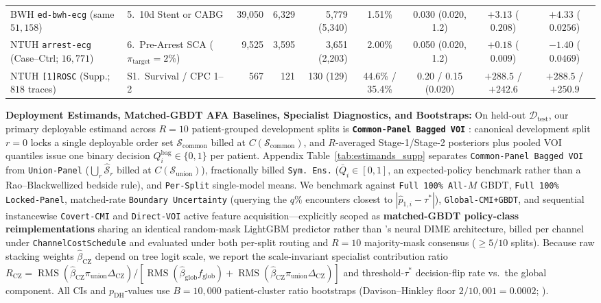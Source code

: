 \documentclass[11pt]{article}
\theoremstyle{remark}
\begin{document}
\begin{table}[t]
{\begin{tabular}{llrrrcccc}
BWH \texttt{ed-bwh-ecg} (same $51{,}158$) & 5.\ 10d Stent or CABG & 39,050 & 6,329 & 5,779 (5,340) & 1.51\% & 0.030 (0.020, 1.2) & $+3.13$ ($0.208$) & $+4.33$ ($0.0256$) \\
NTUH \texttt{arrest-ecg} (Case--Ctrl; $16{,}771$) & 6.\ Pre-Arrest SCA ($\pi_{\text{target}}=2\%$) & 9,525 & 3,595 & 3,651 (2,203) & 2.00\% & 0.050 (0.020, 1.2) & $+0.18$ ($0.009$) & $-1.40$ ($0.0469$) \\
\midrule
NTUH \texttt{[1]ROSC} (Supp.; $818$ traces) & S1.\ Survival / CPC 1--2 & 567 & 121 & 130 (129) & 44.6\% / 35.4\% & 0.20 / 0.15 (0.020) & $+288.5$ / $+242.6$ & $+288.5$ / $+250.9$ \\
\bottomrule
\end{tabular}%
}
\end{table}

\textbf{Deployment Estimands, Matched-GBDT AFA Baselines, Specialist Diagnostics, and Bootstraps:} On held-out $\mathcal{D}_{\text{test}}$, our primary deployable estimand across $R=10$ patient-grouped development splits is \textbf{\texttt{Common-Panel Bagged VOI}} \citep{satz2026collision}: canonical development split $r=0$ locks a single deployable order set $\mathcal{S}_{\text{common}}$ billed at $C(\mathcal{S}_{\text{common}})$, and $R$-averaged Stage-1/Stage-2 posteriors plus pooled VOI quantiles issue one binary decision $Q_i^{\text{bag}} \in \{0,1\}$ per patient. Appendix Table~\ref{tab:estimands_supp} separates \texttt{Common-Panel Bagged VOI} from \texttt{Union-Panel} ($\bigcup_r \hat{\mathcal{S}}_r$ billed at $C(\mathcal{S}_{\text{union}})$), fractionally billed \texttt{Sym.\ Ens.} ($\bar{Q}_i \in [0,1]$, an expected-policy benchmark rather than a Rao--Blackwellized bedside rule), and \texttt{Per-Split} single-model means. We benchmark against \texttt{Full 100\% All-$M$} GBDT, \texttt{Full 100\% Locked-Panel}, matched-rate \texttt{Boundary Uncertainty} (querying the $q\%$ encounters closest to $|\hat{p}_{1,i}-\tau^*|$), \texttt{Global-CMI+GBDT}, and sequential instancewise \texttt{Covert-CMI} and \texttt{Direct-VOI} active feature acquisition---explicitly scoped as \textbf{matched-GBDT policy-class reimplementations} sharing an identical random-mask LightGBM predictor rather than \citet{covert2023learning}'s neural DIME architecture, billed per channel under \texttt{ChannelCostSchedule} and evaluated under both per-split routing and $R=10$ majority-mask consensus ($\ge 5/10$ splits). Because raw stacking weights $\hat{\beta}_{\text{CZ}}$ depend on tree logit scale, we report the scale-invariant specialist contribution ratio $R_{\text{CZ}} = \operatorname{RMS}(\hat{\beta}_{\text{CZ}}\pi_{\text{union}}\Delta_{\text{CZ}})/[\operatorname{RMS}(\hat{\beta}_{\text{glob}}f_{\text{glob}}) + \operatorname{RMS}(\hat{\beta}_{\text{CZ}}\pi_{\text{union}}\Delta_{\text{CZ}})]$ and threshold-$\tau^*$ decision-flip rate vs.\ the global component. All CIs and $p_{\text{DH}}$-values use $B=10{,}000$ patient-cluster ratio bootstraps (Davison--Hinkley floor $2/10{,}001 = 0.0002$; \citealp{davison1997bootstrap}).
\end{document}
